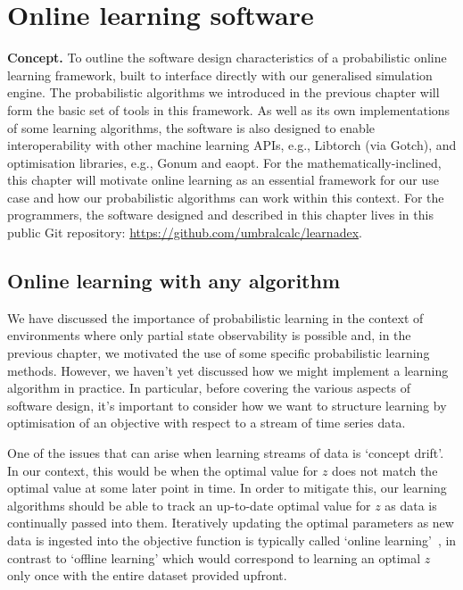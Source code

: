 \chapter{\sffamily Online learning software}

{\bfseries\sffamily Concept.} To outline the software design characteristics of a probabilistic online learning framework, built to interface directly with our generalised simulation engine. The probabilistic algorithms we introduced in the previous chapter will form the basic set of tools in this framework. As well as its own implementations of some learning algorithms, the software is also designed to enable interoperability with other machine learning APIs, e.g., Libtorch (via Gotch), and optimisation libraries, e.g., Gonum and eaopt. For the mathematically-inclined, this chapter will motivate online learning as an essential framework for our use case and how our probabilistic algorithms can work within this context. For the programmers, the software designed and described in this chapter lives in this public Git repository: \href{https://github.com/umbralcalc/learnadex}{https://github.com/umbralcalc/learnadex}.

\section{\sffamily Online learning with any algorithm}

We have discussed the importance of probabilistic learning in the context of environments where only partial state observability is possible and, in the previous chapter, we motivated the use of some specific probabilistic learning methods. However, we haven't yet discussed how we might implement a learning algorithm in practice. In particular, before covering the various aspects of software design, it's important to consider how we want to structure learning by optimisation of an objective with respect to a stream of time series data.

One of the issues that can arise when learning streams of data is `concept drift'. In our context, this would be when the optimal value for $z$ does not match the optimal value at some later point in time. In order to mitigate this, our learning algorithms should be able to track an up-to-date optimal value for $z$ as data is continually passed into them. Iteratively updating the optimal parameters as new data is ingested into the objective function is typically called `online learning'~\cite{hazan2016introduction,sutton2018reinforcement}, in contrast to `offline learning' which would correspond to learning an optimal $z$ only once with the entire dataset provided upfront.

